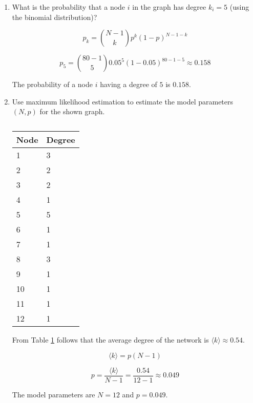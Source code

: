 \begin{enumerate}
	\item What is the probability that a node $i$ in the graph has degree $k_i = 5$ (using the binomial distribution)?
	
	\begin{equation}
	p_k = {N - 1 \choose k} p^k (1-p)^{N-1-k}
	\end{equation}
	
	\begin{equation}
	p_5 = {80 - 1 \choose 5} 0.05^5 (1-0.05)^{80-1-5} \approx 0.158
	\end{equation}
	
	The probability of a node $i$ having a degree of $5$ is $0.158$.
	
	\item Use maximum likelihood estimation to estimate the model parameters $(N, p)$ for the shown graph.
	
	\begin{table}[]
\centering
\begin{tabular}{ll}
\hline
Node & Degree \\ \hline
1    & 3      \\
2    & 2      \\
3    & 2      \\
4    & 1      \\
5    & 5      \\
6    & 1      \\
7    & 1      \\
8    & 3      \\
9    & 1      \\
10   & 1      \\
11   & 1      \\
12   & 1      \\ \hline
\end{tabular}
\caption{}
\label{tab:node_degrees}
\end{table}

From Table \ref{tab:node_degrees} follows that the average degree of the network is $\langle k \rangle \approx 0.54$.

\begin{equation}
\langle k \rangle = p(N-1)
\end{equation}

\begin{equation}
p = \frac{\langle k \rangle}{N-1} = \frac{0.54}{12-1} \approx 0.049
\end{equation}

The model parameters are $N = 12$ and $p = 0.049$.
	

\end{enumerate}
